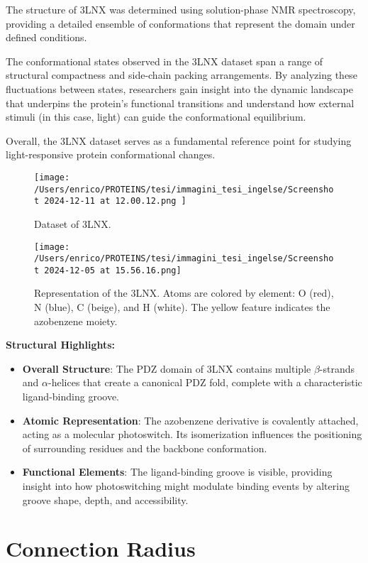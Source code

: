 \documentclass[English, Lau, oneside]{sapthesis}
\begin{document}
The structure of 3LNX was determined using solution-phase NMR spectroscopy, providing a detailed ensemble of conformations that represent the domain under defined conditions. 

The conformational states observed in the 3LNX dataset span a range of structural compactness and side-chain packing arrangements.  
By analyzing these fluctuations between states, researchers gain insight into the dynamic landscape that underpins the protein’s functional transitions and understand how external stimuli (in this case, light) can guide the conformational equilibrium.

Overall, the 3LNX dataset serves as a fundamental reference point for studying light-responsive protein conformational changes. 
\begin{figure}[h!]
    \centering
    \texttt{[image: /Users/enrico/PROTEINS/tesi/immagini\_tesi\_ingelse/Screenshot 2024-12-11 at 12.00.12.png
    ]}
    \caption{Dataset of 3LNX.}
\end{figure}
\begin{figure}[h!]
    \centering
    \texttt{[image: /Users/enrico/PROTEINS/tesi/immagini\_tesi\_ingelse/Screenshot 2024-12-05 at 15.56.16.png]}
    \caption{Representation of the 3LNX. Atoms are colored by element: O (red), N (blue), C (beige), and H (white). The yellow feature indicates the azobenzene moiety.}
\end{figure}

\noindent\textbf{Structural Highlights:}
\begin{itemize}
    \item \textbf{Overall Structure}: The PDZ domain of 3LNX contains multiple $\beta$-strands and $\alpha$-helices that create a canonical PDZ fold, complete with a characteristic ligand-binding groove.
    \item \textbf{Atomic Representation}: The azobenzene derivative is covalently attached, acting as a molecular photoswitch. Its isomerization influences the positioning of surrounding residues and the backbone conformation.
    \item \textbf{Functional Elements}: The ligand-binding groove is visible, providing insight into how photoswitching might modulate binding events by altering groove shape, depth, and accessibility.
\end{itemize}

\newpage
\section{Connection Radius}\label{connection_radius}
\end{document}
